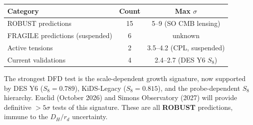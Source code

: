 \documentclass[11pt,a4paper]{article}
\begin{document}
\begin{center}
\begin{tabular}{lcc}
\toprule
\textbf{Category} & \textbf{Count} & \textbf{Max $\sigma$} \\
\midrule
ROBUST predictions & 15 & 5--9 (SO CMB lensing) \\
FRAGILE predictions (suspended) & 6 & unknown \\
Active tensions & 2 & 3.5--4.2 (CPL, suspended) \\
Current validations & 4 & 2.4--2.7 (DES Y6 $S_8$) \\
\bottomrule
\end{tabular}
\end{center}

The strongest DFD test is the scale-dependent growth signature, now
supported by DES Y6 ($S_8 = 0.789$), KiDS-Legacy ($S_8 = 0.815$), and
the probe-dependent $S_8$ hierarchy. Euclid (October 2026) and Simons
Observatory (2027) will provide definitive $> 5\sigma$ tests of this
signature. These are all \textbf{ROBUST} predictions, immune to the
$D_H/r_d$ uncertainty.
\end{document}
